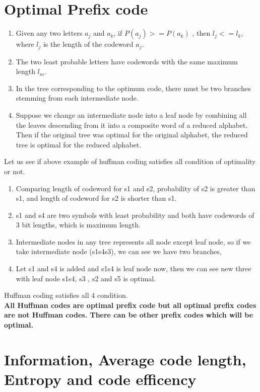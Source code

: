\documentclass[10pt,a4paper]{article}
\begin{document}
\section{Optimal Prefix code}
\begin{enumerate}
	\item  Given any two letters $a_j$ and $a_k$, if $ P(a_j) >= P(a_k) $ , then $ l_j <= l_k $, where $l_j$ is the length of the codeword $a_j$.  
	\item The two least probable letters have codewords with the same maximum length $l_m$. 
	\item In the tree corresponding to the optimum code, there must be two branches stemming from each intermediate node.  
	\item Suppose we change an intermediate node into a leaf node by combining all the leaves descending from it into a composite word of a reduced alphabet. Then if the original tree was optimal for the original alphabet, the reduced tree is optimal for the reduced alphabet. 

\end{enumerate}
Let us see if above example of huffman coding satisfies all condition of optimality or not. 
\begin{enumerate}
	\item  Comparing length of codeword for s1 and s2, probability of s2 is greater than s1, and length of codeword for s2 is shorter than s1.
	\item s1 and s4 are two symbols with least probability and both have codewords of 3 bit lengths, which is maximum length. 
	\item Intermediate nodes in any tree represents all node except leaf node, so if we take intermediate node (s1s4s3), we can see we have two  branches, 
	\item Let s1 and s4  is added and s1s4 is leaf node now, then we can see new three with leaf node s1s4, s3 , s2 and s5 is optimal. 
\end{enumerate}
Huffman coding satisfies all 4 condition.\\
\textbf{All Huffman codes are optimal prefix code but all optimal prefix codes are not Huffman codes. There can be other prefix codes which will be optimal.}
\section{Information, Average code length, Entropy and code efficency}
\end{document}
